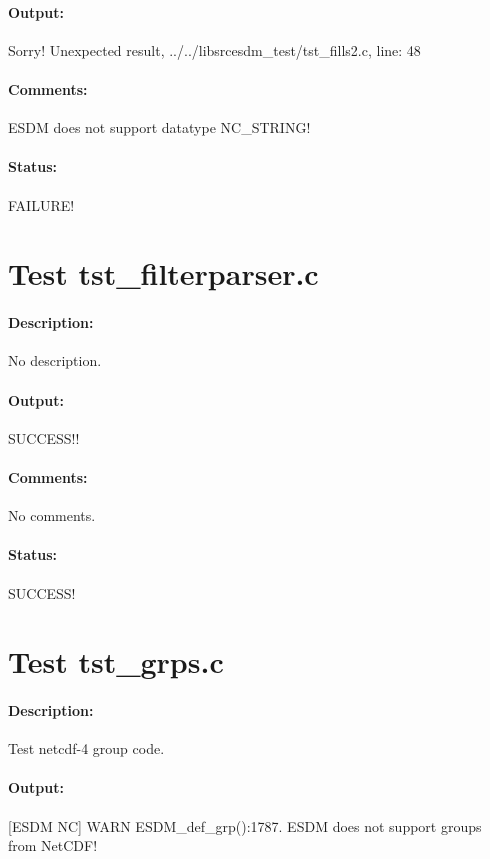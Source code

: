 \paragraph{Output:} Sorry! Unexpected result, ../../libsrcesdm\_test/tst\_fills2.c, line: 48

\paragraph{Comments:} ESDM does not support datatype NC\_STRING!

\paragraph{Status:} FAILURE!

\section{Test tst\_filterparser.c}

\paragraph{Description:} No description.

\paragraph{Output:} SUCCESS!!

\paragraph{Comments:} No comments.

\paragraph{Status:} SUCCESS!

\section{Test tst\_grps.c}

\paragraph{Description:} Test netcdf-4 group code.

\paragraph{Output:} [ESDM NC] WARN ESDM\_def\_grp():1787. ESDM does not support groups from NetCDF!

